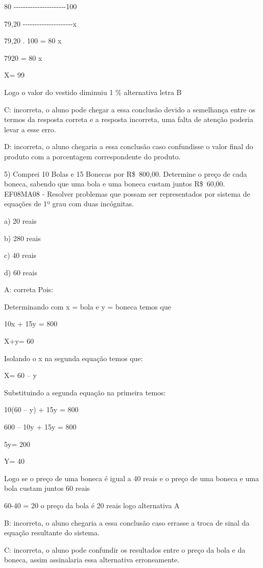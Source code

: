 80 -\/-\/-\/-\/-\/-\/-\/-\/-\/-\/-\/-\/-\/-\/-\/-\/-\/-\/-\/-\/-\/-100

79,20 -\/-\/-\/-\/-\/-\/-\/-\/-\/-\/-\/-\/-\/-\/-\/-\/-\/-\/-\/-\/-x

79,20 . 100 = 80 x

7920 = 80 x

X= 99

Logo o valor do vestido diminuiu 1 \% alternativa letra B

C: incorreta, o aluno pode chegar a essa conclusão devido a semelhança
entre os termos da resposta correta e a resposta incorreta, uma falta de
atenção poderia levar a esse erro.

D: incorreta, o aluno chegaria a essa conclusão caso confundisse o valor
final do produto com a porcentagem correspondente do produto.

5) Comprei 10 Bolas e 15 Bonecas por R\$~800,00. Determine o preço de
cada boneca, sabendo que uma bola e uma boneca custam juntos R\$~60,00.
EF08MA08 - Resolver problemas que possam ser representados por sistema
de equações de 1º grau com duas incógnitas.

a) 20 reais

b) 280 reais

c) 40 reais

d) 60 reais

A: correta Pois:

Determinando com x = bola e y = boneca temos que

10x + 15y = 800

X+y= 60

Isolando o x na segunda equação temos que:

X= 60 -- y

Substituindo a segunda equação na primeira temos:

10(60 -- y) + 15y = 800

600 -- 10y + 15y = 800

5y= 200

Y= 40

Logo se o preço de uma boneca é igual a 40 reais e o preço de uma boneca
e uma bola custam juntos 60 reais

60-40 = 20 o preço da bola é 20 reais logo alternativa A

B: incorreta, o aluno chegaria a essa conclusão caso errasse a troca de
sinal da equação resultante do sistema.

C: incorreta, o aluno pode confundir os resultados entre o preço da bola
e da boneca, assim assinalaria essa alternativa erroneamente.

